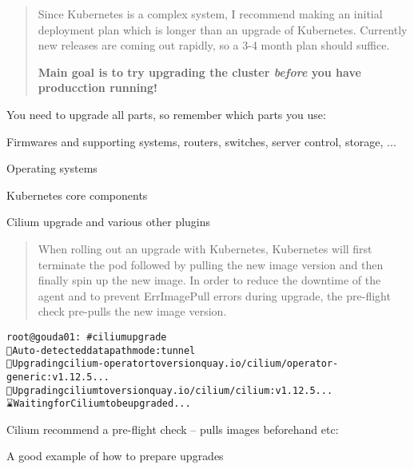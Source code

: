 \documentclass[Screen16to9,17pt]{foils}
\begin{document}


\begin{quote}
Since Kubernetes is a complex system, I recommend making an initial deployment plan which is longer than an upgrade of Kubernetes. Currently new releases are coming out rapidly, so a 3-4 month plan should suffice.

{\bf Main goal is to try upgrading the cluster \emph{before} you have producction running!}
\end{quote}


You need to upgrade all parts, so remember which parts you use:
\begin{list2}
\item Firmwares and supporting systems, routers, switches, server control, storage, ...
\item Operating systems
\item Kubernetes core components
\item Cilium upgrade and various other plugins
\end{list2}



\begin{quote}
When rolling out an upgrade with Kubernetes, Kubernetes will first terminate the pod followed by pulling the new image version and then finally spin up the new image. In order to reduce the downtime of the agent and to prevent ErrImagePull errors during upgrade, the pre-flight check pre-pulls the new image version.
\end{quote}

\begin{alltt}\footnotesize
root@gouda01:~# cilium upgrade
🔮 Auto-detected datapath mode: tunnel
🚀 Upgrading cilium-operator to version quay.io/cilium/operator-generic:v1.12.5...
🚀 Upgrading cilium to version quay.io/cilium/cilium:v1.12.5...
⌛ Waiting for Cilium to be upgraded...

\end{alltt}

\begin{list2}
\item Cilium recommend a pre-flight check -- pulls images beforehand etc:\\
\item A good example of how to prepare upgrades
\end{list2}
\end{document}
